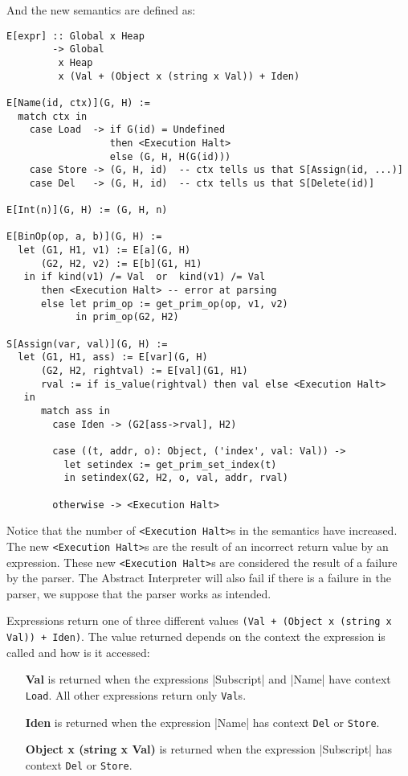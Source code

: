 And the new semantics are defined as:

\begin{verbatim}
E[expr] :: Global x Heap
        -> Global
         x Heap
         x (Val + (Object x (string x Val)) + Iden)

E[Name(id, ctx)](G, H) :=
  match ctx in
    case Load  -> if G(id) = Undefined
                  then <Execution Halt>
                  else (G, H, H(G(id)))
    case Store -> (G, H, id)  -- ctx tells us that S[Assign(id, ...)]
    case Del   -> (G, H, id)  -- ctx tells us that S[Delete(id)]

E[Int(n)](G, H) := (G, H, n)

E[BinOp(op, a, b)](G, H) :=
  let (G1, H1, v1) := E[a](G, H)
      (G2, H2, v2) := E[b](G1, H1)
   in if kind(v1) /= Val  or  kind(v1) /= Val
      then <Execution Halt> -- error at parsing
      else let prim_op := get_prim_op(op, v1, v2)
            in prim_op(G2, H2)

S[Assign(var, val)](G, H) :=
  let (G1, H1, ass) := E[var](G, H)
      (G2, H2, rightval) := E[val](G1, H1)
      rval := if is_value(rightval) then val else <Execution Halt>
   in
      match ass in
        case Iden -> (G2[ass->rval], H2)

        case ((t, addr, o): Object, ('index', val: Val)) ->
          let setindex := get_prim_set_index(t)
          in setindex(G2, H2, o, val, addr, rval)

        otherwise -> <Execution Halt>
\end{verbatim}

Notice that the number of \verb+<Execution Halt>+s in the semantics have increased. The
new \verb+<Execution Halt>+s are the result of an incorrect return value by an expression.
These new \verb+<Execution Halt>+s are considered the result of a failure by the parser.
The Abstract Interpreter will also fail if there is a failure in the parser, we suppose
that the parser works as intended.

Expressions return one of three different values
\verb|(Val + (Object x (string x Val)) + Iden)|. The value returned depends on the
context the expression is called and how is it accessed:

\begin{itemize}
\tightlist
\item[\textbf{Val}] is returned when the expressions \pycode|Subscript| and \pycode|Name|
  have context \verb|Load|. All other expressions return only \verb|Val|s.
\item[\textbf{Iden}] is returned when the expression \pycode|Name| has context \verb|Del|
  or \verb|Store|.
\item[\textbf{Object x (string x Val)}] is returned when the expression \pycode|Subscript|
  has context \verb|Del| or \verb|Store|.
\end{itemize}

